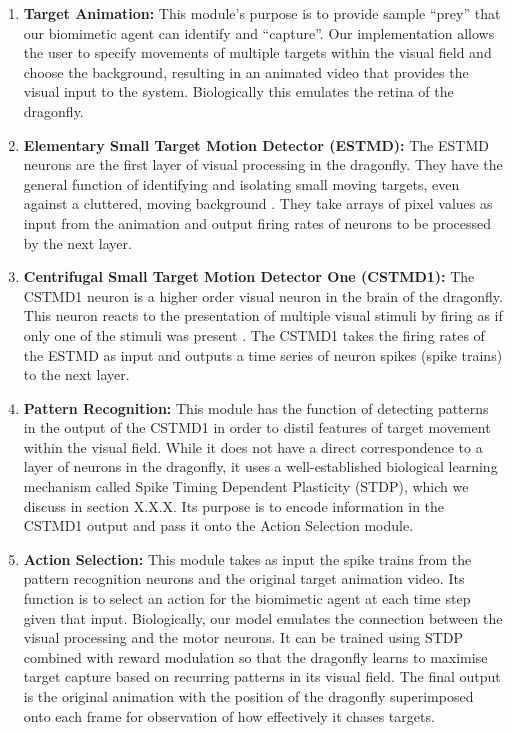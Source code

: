 \documentclass[a4paper,11pt]{article}
\begin{document}
\begin{enumerate}
\item \textbf{Target Animation:} This module's purpose is to provide sample ``prey'' that our biomimetic agent can identify and ``capture''. Our implementation allows the user to specify movements of multiple targets within the visual field and choose the background, resulting in an animated video that provides the visual input to the system. Biologically this emulates the retina of the dragonfly.

\item \textbf{Elementary Small Target Motion Detector (ESTMD):} The ESTMD neurons are the first layer of visual processing in the dragonfly. They have the general function of identifying and isolating small moving targets, even against a cluttered, moving background \cite{Wiederman2008}. They take arrays of pixel values as input from the animation and output firing rates of neurons to be processed by the next layer.

\item \textbf{Centrifugal Small Target Motion Detector One (CSTMD1):} The CSTMD1 neuron is a higher order visual neuron in the brain of the dragonfly. This neuron reacts to the presentation of multiple visual stimuli by firing as if only one of the stimuli was present \cite{w13}. The CSTMD1 takes the firing rates of the ESTMD as input and outputs a time series of neuron spikes (spike trains) to the next layer.

\item \textbf{Pattern Recognition:} This module has the function of detecting patterns in the output of the CSTMD1 in order to distil features of target movement within the visual field. While it does not have a direct correspondence to a layer of neurons in the dragonfly, it uses a well-established biological learning mechanism called Spike Timing Dependent Plasticity (STDP), which we discuss in section X.X.X. Its purpose is to encode information in the CSTMD1 output and pass it onto the Action Selection module.

\item \textbf{Action Selection:} This module takes as input the spike trains from the pattern recognition neurons and the original target animation video. Its function is to select an action for the biomimetic agent at each time step given that input. Biologically, our model emulates the connection between the visual processing and the motor neurons. It can be trained using STDP combined with reward modulation so that the dragonfly learns to maximise target capture based on recurring patterns in its visual field. The final output is the original animation with the position of the dragonfly superimposed onto each frame for observation of how effectively it chases targets.
\end{enumerate}
\end{document}
